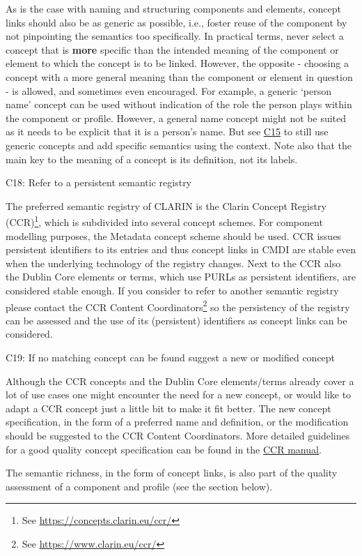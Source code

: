 As is the case with naming and structuring components and elements, concept links should also be as generic as possible, i.e., foster reuse of the component by not pinpointing the semantics too specifically. In practical terms, never select a concept  that is \textbf{more} specific than the intended meaning of the component or element to which the concept is to be linked. However, the opposite - choosing a concept with a more general meaning than the component or element in question - is allowed, and sometimes even encouraged. For example, a generic `person name' concept can be used without indication of the role the person plays within the component or profile. However, a general name concept might not be suited as it needs to be explicit that it is a person's name. But see \hyperref[c15]{C15} to still use generic concepts and add specific semantics using the context.  Note also that the main key to the meaning of a concept is its definition, not its labels.

C18: Refer to a persistent semantic registry


The preferred semantic registry of CLARIN is the Clarin Concept Registry (CCR)\footnote{See \url{https://concepts.clarin.eu/ccr/}}, which is subdivided into several concept schemes. For component modelling purposes, the Metadata concept scheme should be used.  CCR issues persistent identifiers to its entries and thus concept links in CMDI are stable even when the underlying technology of the registry changes. Next to the CCR also the Dublin Core elements or terms, which use PURLs as persistent identifiers, are considered stable enough. If you consider to refer to another semantic registry please contact the
CCR Content Coordinators\footnote{See \url{https://www.clarin.eu/ccr/}} so the persistency of the registry can be assessed and the use of its (persistent) identifiers as concept links can be considered.

\label{c19}
C19: If no matching concept can be found suggest a new or modified concept


Although the CCR concepts and the Dublin Core elements/terms already cover a lot of use cases one might encounter the need for a new concept, or would like to adapt a CCR concept just a little bit to make it fit better. The new concept specification, in the form of a preferred name and definition, or the modification should be suggested to the CCR Content Coordinators. More detailed guidelines for a good quality
concept specification can be found in the 
\href{https://www.overleaf.com/read/pxnsftbcphhb}{CCR manual}.

The semantic richness, in the form of concept links, is also part of the quality assessment of a component and profile (see the  section below).
